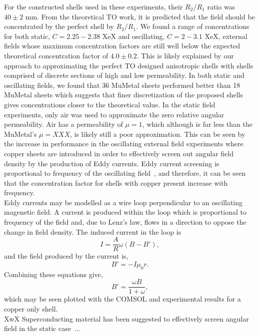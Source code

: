 \documentclass[11pt]{iopart}
\begin{document}
For the constructed shells used in these experiments, their $R_2/R_1$
ratio was $40 \pm 2$ mm. From the theoretical TO work, it is predicted
that the field should be concentrated by the perfect shell by
$R_2/R_1$. We found a range of concentrations for both static, $C =
2.25 - 2.38$ XeX and oscillating, $C = 2 - 3.1$ XeX, external fields
whose maximum concentration factors are still well below the expected
theoretical concentration factor of $4.0 \pm 0.2$. This is likely
explained by our approach to approximating the perfect TO designed
anisotropic shells with shells comprised of discrete sections of high
and low permeability.  In both static and oscillating fields, we found
that 36 MuMetal sheets performed better than 18 MuMetal sheets which
suggests that finer discretization of the proposed shells gives
concentrations closer to the theoretical value. In the static field
experiments, only air was used to approximate the zero relative
angular permeability. Air has a permeability of $\mu = 1$, which
although is far less than the MuMetal's $\mu = XXX$, is likely still a
poor approximation. This can be seen by the increase in performance in
the oscillating external field experiments where copper sheets are
introduced in order to effectively screen out angular field density by
the production of Eddy currents. Eddy current screening is
proportional to frequency of the oscillating field~\cite{XXX}, and
therefore, it can be seen that the concentration factor for shells
with copper present increase with frequency. \\

Eddy currents may be modelled as a wire loop perpendicular to an
oscillating magenetic field. A current is produced within the loop
which is proportional to frequency of the field and, due to Lenz's
law, flows in a direction to oppose the change in field density. The
induced current in the loop is
$$ I = \frac{A}{R}\omega (B - B'), $$
and the field produced by the current is,
$$ B' = -I \mu_0 r. $$
Combining these equations give,
$$ B' = \frac{\omega B}{1+\omega}, $$
which may be seen plotted with the COMSOL and experimental results for
a copper only shell.\\

XwX Superconducting material has been suggested to effectively screen
angular field in the static case~\cite{XXX}... \\
\end{document}
